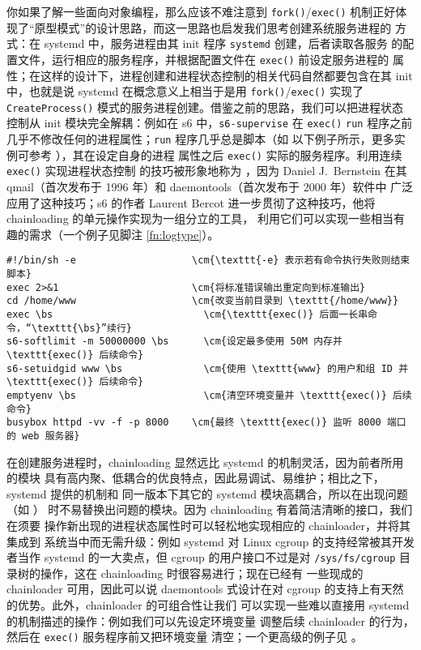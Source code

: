 你如果了解一些面向对象编程，那么应该不难注意到 \verb|fork()|/\verb|exec()|
机制正好体现了“原型模式”的设计思路，而这一思路也启发我们思考创建系统服务进程的
方式：在 systemd 中，服务进程由其 init 程序 \verb|systemd| 创建，后者读取各服务
的配置文件，运行相应的服务程序，并根据配置文件在 \verb|exec()| 前设定服务进程的
属性；在这样的设计下，进程创建和进程状态控制的相关代码自然都要包含在其 init
中，也就是说 systemd 在概念意义上相当于是用 \verb|fork()|/\verb|exec()| 实现了
\verb|CreateProcess()| 模式的服务进程创建。借鉴之前的思路，我们可以把进程状态
控制从 init 模块完全解耦：例如在 s6 中，\verb|s6-supervise| 在 \verb|exec()|
\verb|run| 程序之前几乎不修改任何的进程属性；\verb|run| 程序几乎总是脚本（如
以下例子所示，更多实例可参考 \parencite{pollard2014}），其在设定自身的进程
属性之后 \verb|exec()| 实际的服务程序。利用连续 \verb|exec()| 实现进程状态控制
的技巧被形象地称为 ，因为 Daniel J.\ Bernstein
在其 qmail（首次发布于 1996 年）和 daemontools（首次发布于 2000 年）软件中
广泛应用了这种技巧；s6 的作者 Laurent Bercot 进一步贯彻了这种技巧，他将
chainloading 的单元操作实现为一组分立的工具，
利用它们可以实现一些相当有趣的需求（一个例子见脚注 \ref{fn:logtype}）。
\begin{wquoting}
\begin{Verbatim}[commandchars = {\\\{\}}]
#!/bin/sh -e                    \cm{\texttt{-e} 表示若有命令执行失败则结束脚本}
exec 2>&1                       \cm{将标准错误输出重定向到标准输出}
cd /home/www                    \cm{改变当前目录到 \texttt{/home/www}}
exec \bs                          \cm{\texttt{exec()} 后面一长串命令，“\texttt{\bs}”续行}
s6-softlimit -m 50000000 \bs      \cm{设定最多使用 50M 内存并 \texttt{exec()} 后续命令}
s6-setuidgid www \bs              \cm{使用 \texttt{www} 的用户和组 ID 并 \texttt{exec()} 后续命令}
emptyenv \bs                      \cm{清空环境变量并 \texttt{exec()} 后续命令}
busybox httpd -vv -f -p 8000    \cm{最终 \texttt{exec()} 监听 8000 端口的 web 服务器}
\end{Verbatim}
\end{wquoting}

在创建服务进程时，chainloading 显然远比 systemd 的机制灵活，因为前者所用的模块
具有高内聚、低耦合的优良特点，因此易调试、易维护；相比之下，systemd 提供的机制和
同一版本下其它的 systemd 模块高耦合，所以在出现问题（如 \parencite{edge2017}）
时不易替换出问题的模块。因为 chainloading 有着简洁清晰的接口，我们在须要
操作新出现的进程状态属性时可以轻松地实现相应的 chainloader，并将其集成到
系统当中而无需升级：例如 systemd 对 Linux cgroup 的支持经常被其开发者当作
systemd 的一大卖点，但 cgroup 的用户接口不过是对
\verb|/sys/fs/cgroup| 目录树的操作，这在 chainloading 时很容易进行；现在已经有
一些现成的 chainloader 可用，因此可以说 daemontools
式设计在对 cgroup 的支持上有天然的优势。此外，chainloader 的可组合性让我们
可以实现一些难以直接用 systemd 的机制描述的操作：例如我们可以先设定环境变量
调整后续 chainloader 的行为，然后在 \verb|exec()| 服务程序前又把环境变量
清空；一个更高级的例子见 \parencite{ska:syslogd}。

